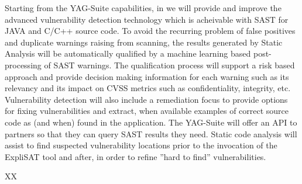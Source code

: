 \begin{Workpackage}{\thewpno}
\begin{Task}
\end{Task}

\begin{Task}

\TaskResults{%
}
\TaskHeader{}

Starting from the YAG-Suite capabilities, in \theTask we will provide and improve the advanced vulnerability detection technology which is acheivable with SAST for JAVA and C/C++ source code. To avoid the recurring problem of false positives and duplicate warnings raising from scanning, the results generated by Static Analysis will be automatically qualified by a machine learning based post-processing of SAST warnings. 
The qualification process will support a risk based approach and provide decision making information for each warning such as its relevancy and its impact on CVSS metrics such as confidentiality, integrity, etc.
Vulnerability detection will also include a remediation focus to provide options for fixing vulnerabilities and extract, when available examples of correct source code as (and when) found in the application.
The YAG-Suite will offer an API to partners so that they can query SAST results they need.
Static code analysis will assist to find suspected vulnerability locations prior to the invocation of the ExpliSAT tool and after, in order to refine ”hard to find” vulnerabilities.


\end{Task}


\begin{WPDeliverables}
  \begin{compactitem}
    \item XX
\end{compactitem}
\end{WPDeliverables}
\end{Workpackage}
